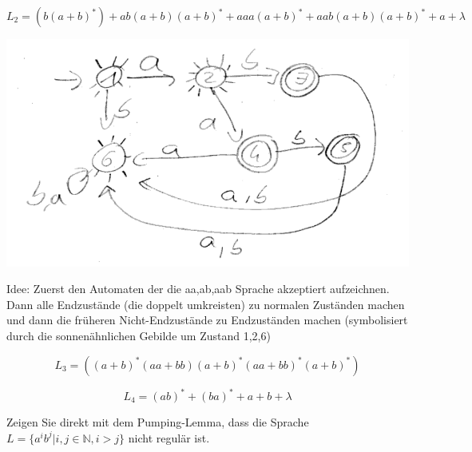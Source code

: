 \documentclass[10pt, a4paper]{exam}
\begin{document}
\begin{questions}
\begin{solution}
        $$L_2 = (b(a+b)^*)+ab(a+b)(a+b)^*+aaa(a+b)^*+aab(a+b)(a+b)^*+a+\lambda$$
        \begin{center}
            \includegraphics[width=1\linewidth]{Assets/ASK_uebung/u03-01.png}
        \end{center}
        Idee: Zuerst den Automaten der die aa,ab,aab Sprache akzeptiert aufzeichnen. Dann alle Endzustände (die doppelt umkreisten) zu normalen Zuständen machen und dann die früheren Nicht-Endzustände zu Endzuständen machen (symbolisiert durch die sonnenähnlichen Gebilde um Zustand 1,2,6)

        $$L_3 = ((a+b)^*(aa+bb)(a+b)^*(aa+bb)^*(a+b)^*)$$

        $$L_4 = (ab)^* + (ba)^*+a+b+\lambda$$
    \end{solution}

    \question Zeigen Sie direkt mit dem Pumping-Lemma, dass die Sprache $L=\{a^i b^j \vert i, j\in\mathbb{N}, i > j\}$ nicht regulär ist.


\end{questions}
\end{document}
